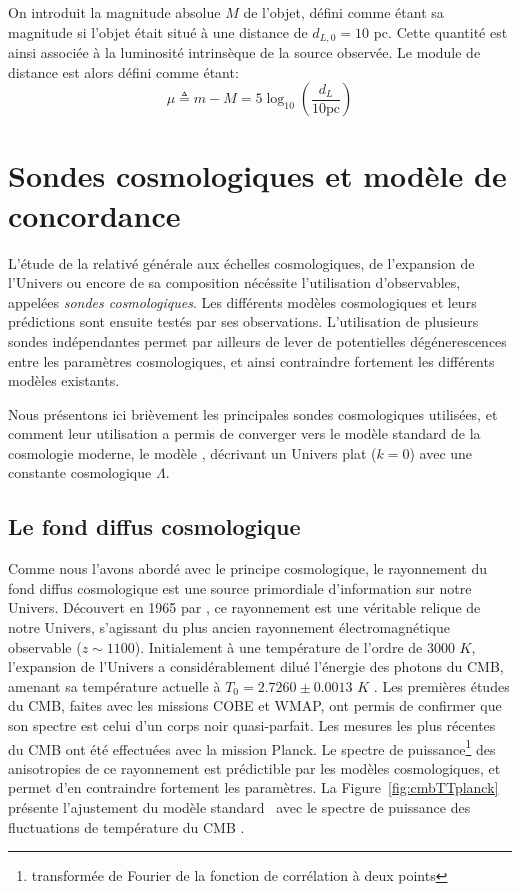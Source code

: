 \documentclass[../main/main.tex]{subfiles}
\begin{document}
On introduit la magnitude absolue $M$ de l'objet, défini comme étant
sa magnitude si l'objet était situé à une distance de $d_{L,0}=10$
pc. Cette quantité est ainsi associée à la luminosité intrinsèque de la
source observée. Le module de distance est alors défini comme étant:
\begin{equation}
  \label{eq:distmodulemu}
  \mu\triangleq m-M=5\log_{10}\left(\frac{d_{L}}{10\text{pc}}\right)
\end{equation}
\section{Sondes cosmologiques et modèle de concordance \lcdm}\label{ssec:LCDM}

L'étude de la relativé générale aux échelles cosmologiques, de
l'expansion de l'Univers ou encore de sa composition nécéssite
l'utilisation d'observables, appelées \textit{sondes cosmologiques}.
Les différents modèles cosmologiques et leurs prédictions sont ensuite
testés par ses observations. L'utilisation de plusieurs sondes
indépendantes permet
par ailleurs de lever de potentielles dégénerescences entre les paramètres
cosmologiques, et ainsi contraindre fortement les différents modèles
existants.

Nous présentons ici brièvement les principales sondes cosmologiques
utilisées, et comment leur utilisation a permis de converger vers le
modèle standard de la cosmologie moderne, le modèle \lcdm, décrivant un
Univers plat ($k=0$) avec une constante cosmologique $\Lambda$.

\subsection{Le fond diffus cosmologique}

Comme nous l'avons abordé avec le principe cosmologique, le rayonnement
du fond diffus cosmologique est une source primordiale d'information sur
notre Univers. Découvert en 1965 par
\citet{Penzias1965}, ce rayonnement est une véritable relique de notre
Univers, s'agissant du plus ancien rayonnement électromagnétique
observable ($z\sim 1100$). Initialement à une température de l'ordre de
$3000$ $K$, l'expansion de l'Univers a considérablement dilué l'énergie des
photons du CMB, amenant sa température actuelle à
$T_{0}=2.7260\pm0.0013$ $K$ \citep{Fixsen2009}. Les
premières études du CMB, faites avec les missions COBE et WMAP, ont
permis de confirmer que son spectre est celui d'un corps noir
quasi-parfait. Les mesures les plus récentes du CMB ont été effectuées avec la mission
Planck.
Le spectre de puissance\footnote{transformée
de Fourier de la fonction de corrélation à deux points} des anisotropies
de ce rayonnement est prédictible par les modèles cosmologiques, et
permet d'en contraindre fortement les paramètres. La
Figure~\ref{fig:cmbTTplanck} présente l'ajustement du modèle standard
\lcdm\ avec le spectre de puissance des fluctuations de température du
CMB \citep{Planckparams2018}.
\end{document}
